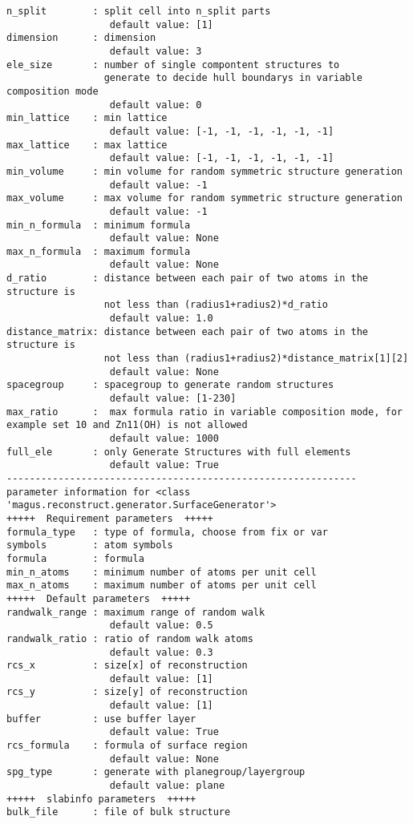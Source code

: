 \documentclass[12pt,oneside]{book}
\begin{document}
\begin{tcolorbox}
\begin{verbatim}
n_split        : split cell into n_split parts
                  default value: [1]
dimension      : dimension
                  default value: 3
ele_size       : number of single compontent structures to
                 generate to decide hull boundarys in variable composition mode
                  default value: 0
min_lattice    : min lattice
                  default value: [-1, -1, -1, -1, -1, -1]
max_lattice    : max lattice
                  default value: [-1, -1, -1, -1, -1, -1]
min_volume     : min volume for random symmetric structure generation
                  default value: -1
max_volume     : max volume for random symmetric structure generation
                  default value: -1
min_n_formula  : minimum formula
                  default value: None
max_n_formula  : maximum formula
                  default value: None
d_ratio        : distance between each pair of two atoms in the structure is
                 not less than (radius1+radius2)*d_ratio
                  default value: 1.0
distance_matrix: distance between each pair of two atoms in the structure is
                 not less than (radius1+radius2)*distance_matrix[1][2]
                  default value: None
spacegroup     : spacegroup to generate random structures
                  default value: [1-230]
max_ratio      :  max formula ratio in variable composition mode, for example set 10 and Zn11(OH) is not allowed
                  default value: 1000
full_ele       : only Generate Structures with full elements
                  default value: True
-------------------------------------------------------------
parameter information for <class 'magus.reconstruct.generator.SurfaceGenerator'>
+++++  Requirement parameters  +++++
formula_type   : type of formula, choose from fix or var
symbols        : atom symbols
formula        : formula
min_n_atoms    : minimum number of atoms per unit cell
max_n_atoms    : maximum number of atoms per unit cell
+++++  Default parameters  +++++
randwalk_range : maximum range of random walk
                  default value: 0.5
randwalk_ratio : ratio of random walk atoms
                  default value: 0.3
rcs_x          : size[x] of reconstruction
                  default value: [1]
rcs_y          : size[y] of reconstruction
                  default value: [1]
buffer         : use buffer layer
                  default value: True
rcs_formula    : formula of surface region
                  default value: None
spg_type       : generate with planegroup/layergroup
                  default value: plane
+++++  slabinfo parameters  +++++
bulk_file      : file of bulk structure

\end{verbatim}
\end{tcolorbox}
\end{document}
